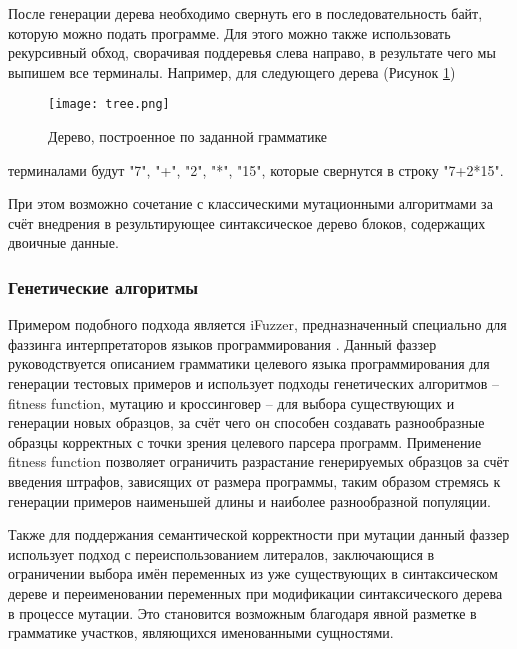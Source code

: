 После генерации дерева необходимо свернуть его в последовательность байт, которую можно подать программе. Для этого можно также использовать рекурсивный обход, сворачивая поддеревья слева направо, в результате чего мы выпишем все терминалы. Например, для следующего дерева (Рисунок \ref{fig:tree_expansion})

\begin{figure}[h]
	\centering
	\texttt{[image: tree.png]}
	\caption{Дерево, построенное по заданной грамматике}
	\label{fig:tree_expansion}
\end{figure}%
\noindent терминалами будут "7", "+", "2", "*", "15", которые свернутся в строку "7+2*15".

При этом возможно сочетание с классическими мутационными алгоритмами за счёт внедрения в результирующее синтаксическое дерево блоков, содержащих двоичные данные.

\subsubsection{Генетические алгоритмы}


Примером подобного подхода является iFuzzer, предназначенный специально для фаззинга интерпретаторов языков программирования \cite{ifuzzer}. Данный фаззер руководствуется описанием грамматики целевого языка программирования для генерации тестовых примеров и использует подходы генетических алгоритмов -- fitness function, мутацию и кроссинговер -- для выбора существующих и генерации новых образцов, за счёт чего он способен создавать разнообразные образцы корректных с точки зрения целевого парсера программ. Применение fitness function позволяет ограничить разрастание генерируемых образцов за счёт введения штрафов, зависящих от размера программы, таким образом стремясь к генерации примеров наименьшей длины и наиболее разнообразной популяции.

Также для поддержания семантической корректности при мутации данный фаззер использует подход с переиспользованием литералов, заключающися в ограничении выбора имён переменных из уже существующих в синтаксическом дереве и переименовании переменных при модификации синтаксического дерева в процессе мутации. Это становится возможным благодаря явной разметке в грамматике участков, являющихся именованными сущностями.
